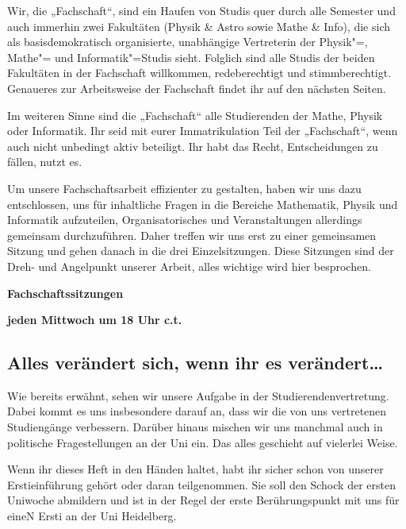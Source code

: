 Wir, die „Fachschaft“, sind ein Haufen von Studis quer durch alle Semester und auch immerhin zwei Fakultäten (Physik \& Astro sowie Mathe \& Info), die sich als basisdemokratisch organisierte, unabhängige Vertreterin der Physik"=, Mathe"= und Informatik"=Studis sieht. Folglich sind alle Studis der beiden Fakultäten in der Fachschaft willkommen, redeberechtigt und stimmberechtigt. Genaueres zur Arbeitsweise der Fachschaft findet ihr auf den nächsten Seiten.

Im weiteren Sinne sind die „Fachschaft“ alle Studierenden der Mathe, Physik oder Informatik. Ihr seid mit eurer Immatrikulation Teil der „Fachschaft“, wenn auch nicht unbedingt aktiv beteiligt. Ihr habt das Recht, Entscheidungen zu fällen, nutzt es.

Um unsere Fachschaftsarbeit effizienter zu gestalten, haben wir uns dazu entschlossen, uns für inhaltliche Fragen in die Bereiche Mathematik, Physik und Informatik aufzuteilen, Organisatorisches und Veranstaltungen allerdings gemeinsam durchzuführen. Daher treffen wir uns erst zu einer gemeinsamen Sitzung und gehen danach in die drei Einzelsitzungen. Diese Sitzungen sind der Dreh- und Angelpunkt unserer Arbeit, alles wichtige wird hier besprochen.

\begin{center}
\large
\textbf{Fachschaftssitzungen}

\textbf{jeden Mittwoch um 18 Uhr \gls{c.t.}}
\end{center}


\subsection{Alles verändert sich, wenn ihr es verändert\dots}
Wie bereits erwähnt, sehen wir unsere Aufgabe in der Studierendenvertretung. Dabei kommt es uns insbesondere darauf an, dass wir die von uns vertretenen Studiengänge verbessern. Darüber hinaus mischen wir uns manchmal auch in politische Fragestellungen an der Uni ein. Das alles geschieht auf vielerlei Weise.

Wenn ihr dieses Heft in den Händen haltet, habt ihr sicher schon von unserer Erstieinführung gehört oder daran teilgenommen. Sie soll den Schock der ersten Uniwoche abmildern und ist in der Regel der erste Berührungspunkt mit uns für eineN Ersti an der Uni Heidelberg.


